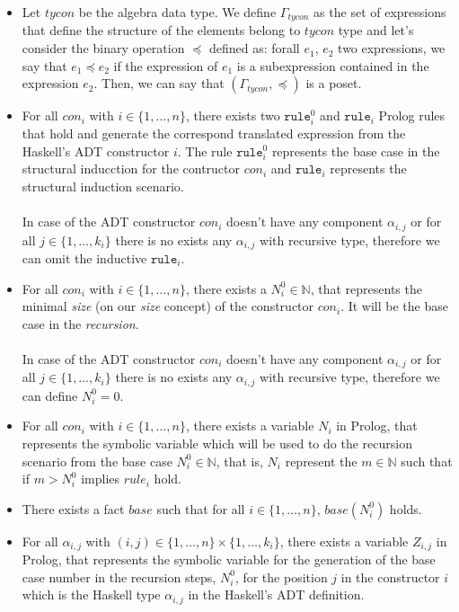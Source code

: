 \documentclass{report}
\theoremstyle{definition}
\theoremstyle{definition}
\newcommand{\ttt}[1]{\texttt{#1}}
\begin{document}
\begin{itemize}
	\item Let $tycon$ be the algebra data type. We define $\Gamma_{tycon}$ as the set of expressions that define the structure of the elements belong to $tycon$ type and let's consider the binary operation $\preceq$ defined as: forall $e_1$, $e_2$ two expressions, we say that $e_1 \preceq e_2$ if the expression of $e_1$ is a subexpression contained in the expression $e_2$. Then, we can say that $(\Gamma_{tycon}, \preceq)$ is a poset.
	\item For all $con_i$ with $i \in \{1, \ldots, n \}$, there exists two $\ttt{rule}_{i}^{0}$ and $\ttt{rule}_i$ Prolog rules that hold and generate the correspond translated expression from the Haskell's ADT constructor $i$. The rule $\ttt{rule}_{i}^{0}$ represents the base case in the structural inducction for the contructor $con_i$ and $\ttt{rule}_i$ represents the structural induction scenario.\\\\
	In case of the ADT constructor $con_i$ doesn't have any component $\alpha_{i,j}$ or for all $j \in \{1, \ldots, k_i \}$ there is no exists any $\alpha_{i,j}$ with recursive type, therefore we can omit the inductive $\ttt{rule}_i$.
	\item For all $con_i$ with $i \in \{1, \ldots, n \}$, there exists a $N_{i}^{0} \in \mathbb{N}$, that represents the minimal \textit{size} (on our \textit{size} concept) of the constructor $con_i$. It will be the base case in the \textit{recursion}.\\\\
	In case of the ADT constructor $con_i$ doesn't have any component $\alpha_{i,j}$ or for all $j \in \{1, \ldots, k_i \}$ there is no exists any $\alpha_{i,j}$ with recursive type, therefore we can define $N_{i}^{0} = 0$.
	\item For all $con_i$ with $i \in \{1, \ldots, n \}$, there exists a variable $N_i$ in Prolog, that represents the symbolic variable which will be used to do the recursion scenario from the base case $N_{i}^{0} \in \mathbb{N}$, that is, $N_i$ represent the $m \in \mathbb{N}$ such that if $m > N_{i}^{0}$ implies $rule_i$ hold.
	\item There exists a fact $base$ such that for all $i \in \{1, \ldots, n \}$, $base(N_{i}^{0})$ holds.
	\item For all $\alpha_{i,j}$ with $(i,j) \in \{1, \ldots, n \} \times \{1, \ldots, k_i \}$, there exists a variable $Z_{i,j}$ in Prolog, that represents the symbolic variable for the generation of the base case number in the recursion steps, $N_{i}^{0}$, for the position $j$ in the constructor $i$ which is the Haskell type $\alpha_{i,j}$ in the Haskell's ADT definition.\\\\

\end{itemize}
\end{document}
